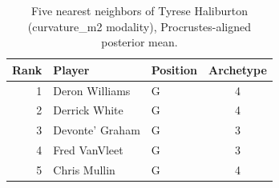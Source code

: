 \begin{table}[htbp]
  \centering\small
  \begin{tabular}{rllc}
    \toprule
    Rank & Player & Position & Archetype \\
    \midrule
    1 & Deron Williams & G & 4 \\
    2 & Derrick White & G & 4 \\
    3 & Devonte' Graham & G & 3 \\
    4 & Fred VanVleet & G & 3 \\
    5 & Chris Mullin & G & 4 \\
    \bottomrule
  \end{tabular}
  \caption{Five nearest neighbors of Tyrese Haliburton (curvature_m2 modality), Procrustes-aligned posterior mean.}
  \label{tab:Tyrese_Haliburton_neighbors_curvature_m2}
\end{table}

